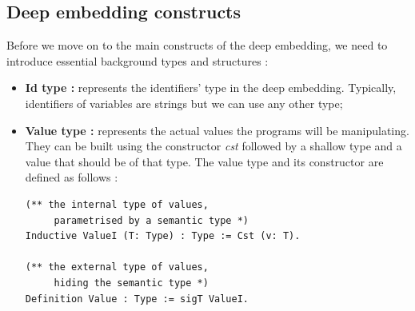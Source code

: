 \subsection{Deep embedding constructs}
Before we move on to the main constructs of the deep embedding, we need to introduce essential background types and structures :
\begin{itemize}
	\item \textbf{Id type :} represents the identifiers' type in the deep embedding. Typically, identifiers of variables are strings but we can use any other type;
	\item \textbf{Value type :} represents the actual values the programs will be manipulating. They can be built using the constructor \textit{cst} followed by a shallow type and a value that should be of that type. The value type and its constructor are defined as follows :
\vfill
\begin{lstlisting}[caption = {Values in the deep embedding},xleftmargin=.02\textwidth,xrightmargin=.02\textwidth]
(** the internal type of values,
	 parametrised by a semantic type *)
Inductive ValueI (T: Type) : Type := Cst (v: T).

(** the external type of values,
	 hiding the semantic type *)
Definition Value : Type := sigT ValueI.


\end{lstlisting}
\end{itemize}
